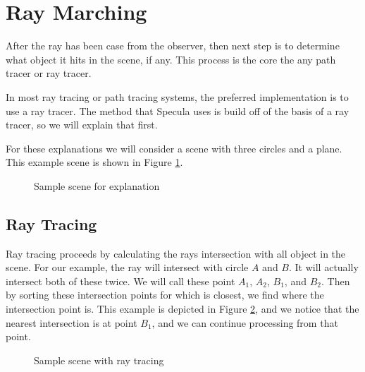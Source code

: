 \documentclass[../pbr.tex]{subfile}
\begin{document}
\section{Ray Marching}%
\label{sec:ray_marching}

After the ray has been case from the observer, then next step is to determine
what object it hits in the scene, if any. This process is the core the any path
tracer or ray tracer.

In most ray tracing or path tracing systems, the preferred implementation is to
use a ray tracer. The method that Specula uses is build off of the basis of a
ray tracer, so we will explain that first.

For these explanations we will consider a scene with three circles and a plane.
This example scene is shown in Figure \ref{fig:p1_2d_scene}.

\begin{figure}[htpb]
\begin{center}
\end{center}
\caption{Sample scene for explanation}%
\label{fig:p1_2d_scene}
\end{figure}

\subsection{Ray Tracing}%
\label{sub:ray_tracing}

Ray tracing proceeds by calculating the rays intersection with all object in
the scene. For our example, the ray will intersect with circle $A$ and $B$. It
will actually intersect both of these twice. We will call these point $A_1$,
$A_2$, $B_1$, and $B_2$. Then by sorting these intersection points for which is
closest, we find where the intersection point is. This example is depicted in
Figure \ref{fig:p1_2d_scene2}, and we notice that the nearest intersection is
at point $B_1$, and we can continue processing from that point.

\begin{figure}[htpb]
\begin{center}
\end{center}
\caption{Sample scene with ray tracing}%
\label{fig:p1_2d_scene2}
\end{figure}
\end{document}
